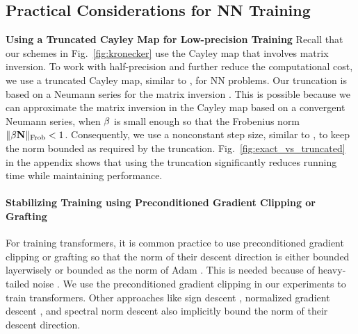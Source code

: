 \subsection{Practical Considerations for NN Training}
\label{sec:practical_NN}
\vspace{-0.2cm}
{\bf Using a Truncated Cayley Map
for Low-precision Training
}
Recall that our schemes in Fig.~\ref{fig:kronecker} use the Cayley map that involves matrix inversion.
To  work with half-precision and further reduce the computational cost, 
we use a truncated Cayley map, similar to \citet{  liu2021orthogonal,li2020efficient,qiu2023controlling}, 
for NN problems. 
Our truncation is based on a Neumann series for the matrix inversion \citep{krishnan2017neumann,lorraine2020optimizing,qiu2023controlling}. This is possible because we can approximate the matrix inversion in the Cayley map
%
 \scalebox{0.8}{ $ \approx (\vI+\stepsize \vN)^2 (\vI+ (\stepsize \vN)^2)(\vI+ (\stepsize \vN)^4)
 $}
%
based on a convergent Neumann series,  when $\beta$ is small enough so that the Frobenius norm $\|\beta \mbox{$\mbox{$\mathbf{N}$}$}\|_{\text{Frob}}<1$.
Consequently, we use a nonconstant step size, similar to \citet{lincan2024}, to keep the norm bounded as required by the truncation.
Fig.~\ref{fig:exact_vs_truncated} in the appendix shows that using the truncation significantly reduces running time while maintaining performance.



\vspace{-0.4cm}
\paragraph{
Stabilizing Training using Preconditioned Gradient Clipping or Grafting}
For training transformers, it is common practice to use preconditioned gradient clipping \citep{liu2023sophia,shen2024variational} or grafting \citep{agarwal2019efficient,shi2023distributed,vyas2024soap} so that
the norm of their descent direction is either bounded layerwisely \citep{zhang2024transformers} or bounded as the norm of Adam \citep{shi2023distributed,vyas2024soap}.
This is needed because of heavy-tailed noise \citep{zhang2020adaptive}. We use the preconditioned gradient clipping in our experiments to train transformers.
Other approaches like sign descent \citep{chen2023symbolic}, normalized gradient descent \citep{cutkosky2020momentum}, and 
spectral norm descent
\citep{bernstein2024old,muon2024}
also implicitly bound the norm of their descent direction.



%

%
%
%
%
